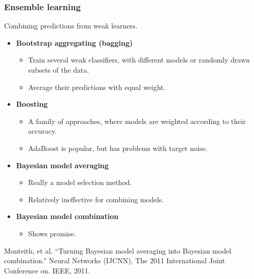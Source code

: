 \begin{frame}
\frametitle{Ensemble learning}
Combining predictions from weak learners.
\begin{itemize}
\item {\bf Bootstrap aggregating (bagging)}
\begin{itemize}
\item Train several weak classifiers, with different models or randomly drawn subsets of the data.
\item Average their predictions with equal weight.
\end{itemize}
\item {\bf Boosting}
\begin{itemize}
\item A family of approaches, where models are weighted according to their accuracy.
\item AdaBoost is popular, but has problems with target noise.
\end{itemize}
\item {\bf Bayesian model averaging}
\begin{itemize}
\item Really a model selection method.
\item Relatively ineffective for combining models.
\end{itemize}
\item {\bf Bayesian model combination}
\begin{itemize}
\item Shows promise.
\end{itemize}
\end{itemize}
\begin{tiny}
Monteith, et al. ``Turning Bayesian model averaging into Bayesian model combination.'' Neural Networks (IJCNN), The 2011 International Joint Conference on. IEEE, 2011.\par
\end{tiny}
\end{frame}


